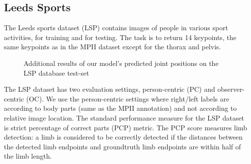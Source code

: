 \documentclass{article}
\begin{document}
\subsection{Leeds Sports}
The Leeds sports dataset \cite{Johnson10} (LSP) contains  images of people in various sport activities,  for training and  for testing. The task is to return 14 keypoints, the same keypoints as in the MPII dataset except for the thorax and pelvis.\\

\begin{figure}[!ht]
	\centering
	

	\caption{Additional results of our model's predicted joint positions on the LSP database test-set \cite{Johnson10}} 
	\label{fig:lsp-pred-images}
\end{figure}

The LSP dataset has two evaluation settings, person-centric (PC) and observer-centric (OC). We use the person-centric settings where right/left labels are according to body parts  (same as the MPII annotation) and not according to relative image location. The standard performance measure for the LSP dataset is strict percentage of correct parts (PCP) metric. The  PCP score measures limb detection: a limb is considered to be correctly detected if the distances between the detected limb endpoints and groundtruth limb endpoints are within half of the limb length. \\
\end{document}
